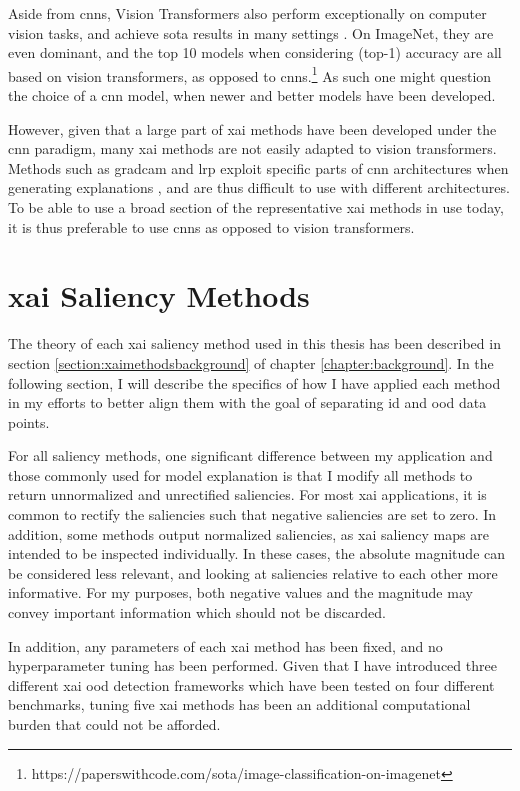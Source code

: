 \documentclass[UKenglish]{uiomasterthesis} %
\theoremstyle{definition}
\begin{document}
Aside from \acp{cnn}, Vision Transformers also perform exceptionally on computer vision tasks, and achieve \ac{sota} results in many settings \cite{vit}. On ImageNet, they are even dominant, and the top 10 models when considering (top-1) accuracy are all based on vision transformers, as opposed to \acp{cnn}.\footnote{https://paperswithcode.com/sota/image-classification-on-imagenet} As such one might question the choice of a \ac{cnn} model, when newer and better models have been developed.

However, given that a large part of \ac{xai} methods have been developed under the \ac{cnn} paradigm, many \ac{xai} methods are not easily adapted to vision transformers. Methods such as \ac{gradcam} and \ac{lrp} exploit specific parts of \ac{cnn} architectures when generating explanations \cite{legrad}, and are thus difficult to use with different architectures. To be able to use a broad section of the representative \ac{xai} methods in use today, it is thus preferable to use \acp{cnn} as opposed to vision transformers.

\section{\ac{xai} Saliency Methods} \label{section:methodology_xai}

The theory of each \ac{xai} saliency method used in this thesis has been described in section \ref{section:xaimethodsbackground} of chapter \ref{chapter:background}. In the following section, I will describe the specifics of how I have applied each method in my efforts to better align them with the goal of separating \ac{id} and \ac{ood} data points.

For all saliency methods, one significant difference between my application and those commonly used for model explanation is that I modify all methods to return unnormalized and unrectified saliencies. For most \ac{xai} applications, it is common to rectify the saliencies such that negative saliencies are set to zero. In addition, some methods output normalized saliencies, as \ac{xai} saliency maps are intended to be inspected individually. In these cases, the absolute magnitude can be considered less relevant, and looking at saliencies relative to each other more informative. For my purposes, both negative values and the magnitude may convey important information which should not be discarded.

In addition, any parameters of each \ac{xai} method has been fixed, and no hyperparameter tuning has been performed. Given that I have introduced three different \ac{xai} \ac{ood} detection frameworks which have been tested on four different benchmarks, tuning five \ac{xai} methods has been an additional computational burden that could not be afforded.
\end{document}
